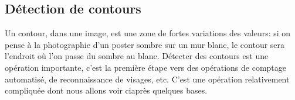 \documentclass[letterpaper,10pt,english]{jupyterBook}
\begin{document}
\begin{sphinxVerbatimInput}

\begin{sphinxVerbatim}[commandchars=\\\{\}]
\end{sphinxVerbatim}
\end{sphinxVerbatimInput}
\begin{sphinxVerbatimInput}

\begin{sphinxVerbatim}[commandchars=\\\{\}]
\end{sphinxVerbatim}
\end{sphinxVerbatimInput}
\begin{sphinxVerbatimOutput}

\noindent{}
\end{sphinxVerbatimOutput}


\subsection{Détection de contours}
\label{\detokenize{notebooks/images/TRAITEMENT-DES-IMAGES:detection-de-contours}}
\sphinxAtStartPar
Un contour, dans une image, est une zone de fortes variations des valeurs: si on pense à la
photographie d’un poster sombre sur un mur blanc, le contour sera l’endroit où l’on passe
du sombre au blanc. Détecter des contours est une opération importante, c’est la première étape vers des opérations de comptage automatisé, de reconnaissance de visages, etc. C’est une opération relativement compliquée dont nous allons voir ci\sphinxhyphen{}après quelques bases.
\end{document}
